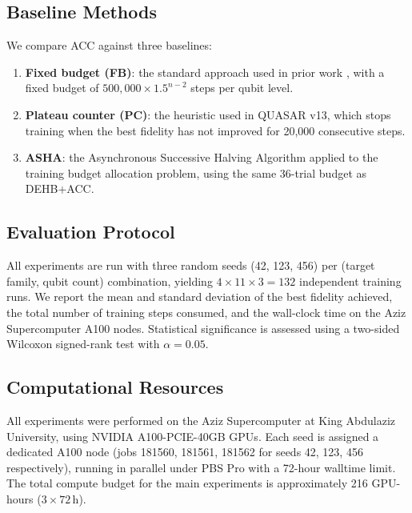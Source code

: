 \subsection{Baseline Methods}

We compare ACC against three baselines:
\begin{enumerate}
  \item \textbf{Fixed budget (FB)}: the standard approach used in prior work
    \cite{yao2021reinforcement,moro2021quantum}, with a fixed budget of
    $500{,}000 \times 1.5^{n-2}$ steps per qubit level.
  \item \textbf{Plateau counter (PC)}: the heuristic used in QUASAR v13,
    which stops training when the best fidelity has not improved for 20,000
    consecutive steps.
  \item \textbf{ASHA}: the Asynchronous Successive Halving Algorithm
    \cite{li2020system} applied to the training budget allocation problem,
    using the same 36-trial budget as DEHB+ACC.
\end{enumerate}

\subsection{Evaluation Protocol}

All experiments are run with three random seeds (42, 123, 456) per
(target family, qubit count) combination, yielding $4 \times 11 \times 3 = 132$
independent training runs. We report the mean and standard deviation of the
best fidelity achieved, the total number of training steps consumed, and the
wall-clock time on the Aziz Supercomputer A100 nodes. Statistical significance
is assessed using a two-sided Wilcoxon signed-rank test with $\alpha = 0.05$.

\subsection{Computational Resources}

All experiments were performed on the Aziz Supercomputer at King Abdulaziz
University, using NVIDIA A100-PCIE-40GB GPUs. Each seed is assigned a
dedicated A100 node (jobs 181560, 181561, 181562 for seeds 42, 123, 456
respectively), running in parallel under PBS Pro with a 72-hour walltime limit.
The total compute budget for the main experiments is approximately 216 GPU-hours
($3 \times 72\,\mathrm{h}$).

